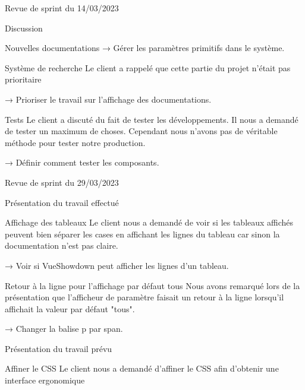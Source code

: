 \documentclass[]{article}
\begin{document}
{\begin{section}{Revue de sprint du 14/03/2023}
\begin{subsection}{Discussion}
\begin{subsubsection}{Nouvelles documentations}
         → Gérer les paramètres primitifs dans le système.
     \end{subsubsection}

     \begin{subsubsection}{Système de recherche}
         Le client a rappelé que cette partie du projet n’était pas prioritaire

         → Prioriser le travail sur l’affichage des documentations.
     \end{subsubsection}

     \begin{subsubsection}{Tests}
         Le client a discuté du fait de tester les développements. Il nous a demandé de tester un maximum de choses. Cependant nous n’avons pas de véritable méthode pour tester notre production.

         → Définir comment tester les composants.
     \end{subsubsection}
 \end{subsection}
\end{section}

\begin{section}{Revue de sprint du 29/03/2023}
 \begin{subsection}{Présentation du travail effectué}
     \begin{subsubsection}{Affichage des tableaux}
         Le client nous a demandé de voir si les tableaux affichés peuvent bien séparer les cases en affichant les lignes du tableau car sinon la documentation n’est pas claire.

         → Voir si VueShowdown peut afficher les lignes d’un tableau.
     \end{subsubsection}

     \begin{subsubsection}{Retour à la ligne pour l’affichage par défaut tous}
         Nous avons remarqué lors de la présentation que l’afficheur de paramètre faisait un retour à la ligne lorsqu’il affichait la valeur par défaut "tous".

         → Changer la balise p par span.
     \end{subsubsection}
 \end{subsection}

 \newpage

 \begin{subsection}{Présentation du travail prévu}
     \begin{subsubsection}{Affiner le CSS}
         Le client nous a demandé d’affiner le CSS afin d’obtenir une interface ergonomique


\end{subsubsection}
\end{subsection}
\end{section}}
\end{document}
